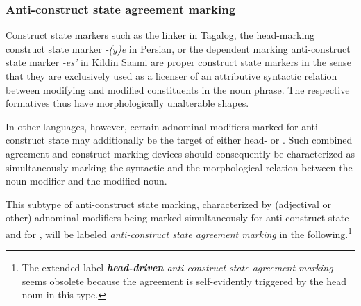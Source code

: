 \subsubsection{Anti\hyp{}construct state agreement marking} \label{anti-constr agr}
Construct state markers such as the linker in Tagalog, the head-marking construct state marker \textit{-(y)e} in Persian, or the dependent marking anti\hyp{}construct state marker \textit{-es'} in Kildin Saami are proper construct state markers in the sense that they are exclusively used as a licenser of an attributive syntactic relation between modifying and modified constituents in the noun phrase. The respective formatives thus have morphologically unalterable shapes.

In other languages, however, certain adnominal modifiers marked for anti\hyp{}construct state may additionally be the target of either head- or . Such combined agreement and construct marking devices should consequently be characterized as simultaneously marking the syntactic and the morphological relation between the noun modifier and the modified noun. 

This subtype of anti\hyp{}construct state marking, characterized by (adjectival or other) adnominal modifiers being marked simultaneously for anti\hyp{}construct state and for , will be labeled \emph{anti\hyp{}construct state agreement marking} in the following.\footnote{The extended label \emph{\textbf{head\hyp{}driven} anti\hyp{}construct state agreement marking} seems obsolete because the agreement is self-evidently triggered by the head noun in this type.} %

